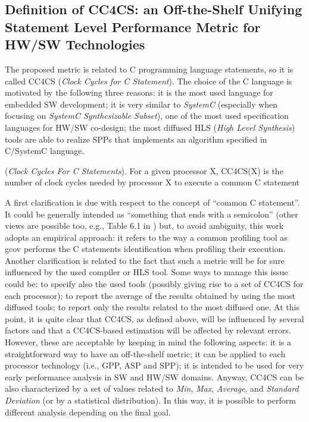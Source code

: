 \subsection{Definition of CC4CS: an Off-the-Shelf Unifying Statement Level Performance Metric for HW/SW Technologies}
%
The proposed metric is related to C programming language statements, so it is called CC4CS (\textit{Clock Cycles for C Statement}). The choice of the C language is motivated by the following three reasons: it is the most used language for embedded SW development; it is very similar to \textit{SystemC} \cite{bib24_a} (especially when focusing on \textit{SystemC Synthesizable Subset}), one of the most used specification languages for HW/SW co-design; the most diffused HLS (\textit{High Level Synthesis}) tools are able to realize SPPs that implements an algorithm specified in C/SystemC language. 
%
\theoremstyle{definition}
\begin{definition}{(\textit{Clock Cycles For C Statements}).}\label{def1_1}
For a given processor X, CC4CS(X) is the number of clock cycles needed by processor X to execute a common C statement
\end{definition}
%
A first clarification is due with respect to the concept of “common C statement”. It could be generally intended as “something that ends with a semicolon” (other views are possible too, e.g., Table 6.1 in \cite{bibCC4CS02}) but, to avoid ambiguity, this work adopts an empirical approach: it refers to the way a common profiling tool as gcov \cite{bibCC4CS03} performs the C statements identification when profiling their execution. Another clarification is related to the fact that such a metric will be for sure influenced by the used compiler or HLS tool. Some ways to manage this issue could be: to specify also the used tools (possibly giving rise to a set of CC4CS for each processor); to report the average of the results obtained by using the most diffused tools; to report only the results related to the most diffused one. At this point, it is quite clear that CC4CS, as defined above, will be influenced by several factors and that a CC4CS-based estimation will be affected by relevant errors. However, these are acceptable by keeping in mind the following aspects: it is a straightforward way to have an off-the-shelf metric; it can be applied to each processor technology (i.e., GPP, ASP and SPP); it is intended to be used for very early performance analysis in SW and HW/SW domains. Anyway, CC4CS can be also characterized by a set of values related to \textit{Min}, \textit{Max}, \textit{Average}, and \textit{Standard Deviation} (or by a statistical distribution). In this way, it is possible to perform different analysis depending on the final goal.
%
%
